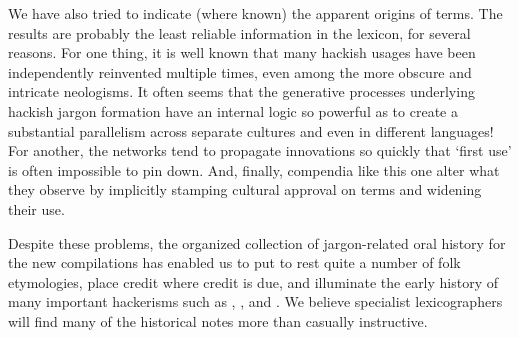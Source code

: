 We have also tried to indicate (where known) the apparent origins of terms. The
results are probably the least reliable information in the lexicon, for several
reasons. For one thing, it is well known that many hackish usages have been
independently reinvented multiple times, even among the more obscure and
intricate neologisms. It often seems that the generative processes underlying
hackish jargon formation have an internal logic so powerful as to create a
substantial parallelism across separate cultures and even in different
languages! For another, the networks tend to propagate innovations so quickly
that `first use' is often impossible to pin down. And, finally, compendia like
this one alter what they observe by implicitly stamping cultural approval on
terms and widening their use.

Despite these problems, the organized collection of jargon-related oral history
for the new compilations has enabled us to put to rest quite a number of folk
etymologies, place credit where credit is due, and illuminate the early history
of many important hackerisms such as , , and
. We believe specialist lexicographers will find many of the
historical notes more than casually instructive.

